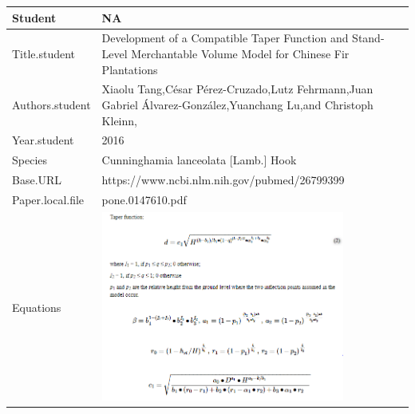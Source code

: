 \documentclass[]{article}
\begin{document}
\begin{tabular}{p{} p{}}
\hline
Student & NA \\ \hline
Title.student & Development of a Compatible Taper Function and Stand-Level Merchantable Volume Model for Chinese Fir Plantations \\ \hline
Authors.student & Xiaolu Tang,César Pérez-Cruzado,Lutz Fehrmann,Juan Gabriel Álvarez-González,Yuanchang Lu,and Christoph Kleinn, \\ \hline
Year.student & 2016 \\ \hline
Species & Cunninghamia lanceolata [Lamb.] Hook \\ \hline
Base.URL & https://www.ncbi.nlm.nih.gov/pubmed/26799399 \\ \hline
Paper.local.file & pone.0147610.pdf \\ \hline
Equations & \includegraphics[width=0.8\textwidth]{Equations/2016TangEtAl.png} \\ \hline
\end{tabular}
\end{document}
